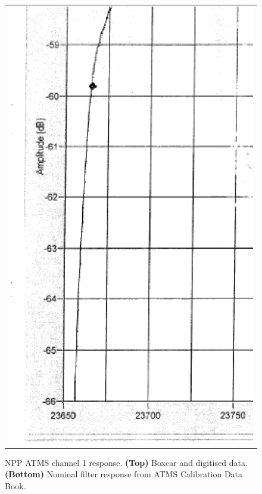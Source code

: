 \begin{figure}[H]
\begin{tabular}{c}
    \includegraphics[bb=249 194 1431 1035,scale=0.3]{graphics/log_book/ch1.eps}
  \end{tabular}
  \caption{NPP ATMS channel 1 response. \textbf{(Top)} Boxcar and digitised data. \textbf{(Bottom)} Nominal filter response from ATMS Calibration Data Book\cite{ATMS_PFM_CalLog}.}
  \label{fig:atms_npp.ch1.srf}
\end{figure}

